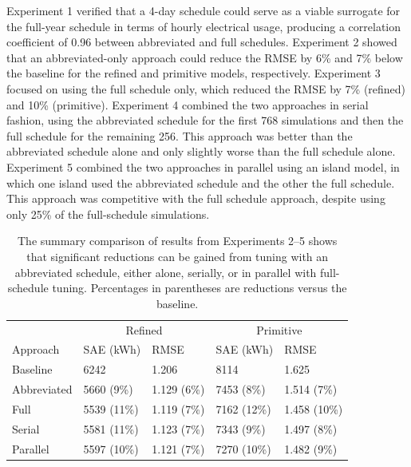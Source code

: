 \documentclass[preprint, review, 12pt]{elsarticle}
\begin{document}
Experiment 1 verified that a 4-day schedule could serve as a viable surrogate for the full-year schedule in terms of hourly electrical usage, producing a correlation coefficient of 0.96 between abbreviated and full schedules. Experiment 2 showed that an abbreviated-only approach could reduce the RMSE by 6\% and 7\% below the baseline for the refined and primitive models, respectively. Experiment 3 focused on using the full schedule only, which reduced the RMSE by 7\% (refined) and 10\% (primitive). Experiment 4 combined the two approaches in serial fashion, using the abbreviated schedule for the first 768 simulations and then the full schedule for the remaining 256. This approach was better than the abbreviated schedule alone and only slightly worse than the full schedule alone. Experiment 5 combined the two approaches in parallel using an island model, in which one island used the abbreviated schedule and the other the full schedule. This approach was competitive with the full schedule approach, despite using only 25\% of the full-schedule simulations.


\begin{table}[htbp]
\centering
\caption{The summary comparison of results from Experiments 2--5 shows that significant reductions can be gained from tuning with an abbreviated schedule, either alone, serially, or in parallel with full-schedule tuning. Percentages in parentheses are reductions versus the baseline.}
\label{tab:hourly-summary}
\begin{tabular}{lllll}
\toprule
 &  \multicolumn{2}{c}{Refined} & \multicolumn{2}{c}{Primitive}\\
Approach & SAE (kWh) & RMSE & SAE (kWh) & RMSE \\
\midrule
Baseline    & 6242        & 1.206       & 8114        & 1.625 \\\rowcolor{DarkRow}
Abbreviated & 5660 (9\%)  & 1.129 (6\%) & 7453 (8\%)  & 1.514 (7\%)\\
Full        & 5539 (11\%) & 1.119 (7\%) & 7162 (12\%) & 1.458 (10\%)\\\rowcolor{DarkRow}
Serial      & 5581 (11\%) & 1.123 (7\%) & 7343 (9\%)  & 1.497 (8\%)\\
Parallel    & 5597 (10\%) & 1.121 (7\%) & 7270 (10\%) & 1.482 (9\%)\\
\bottomrule
\end{tabular}
\end{table}
\end{document}
